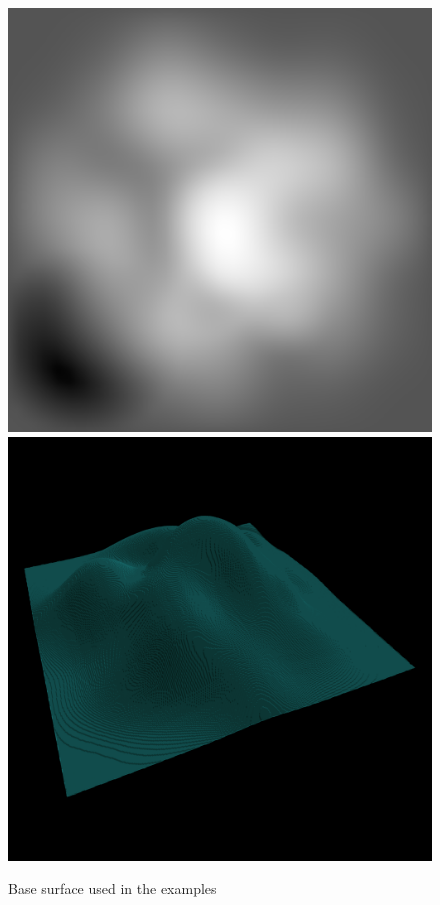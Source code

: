     \begin{figure}[H]
      \centering
      \includegraphics[width=\imagewidth]{images/results/terrains/512-1/orig}
      \includegraphics[width=\imagewidth]{images/results/terrains/512-1/orig_3d}
      \caption{Base surface used in the examples}
      \label{fig:ex-base-surface}
    \end{figure}
    
